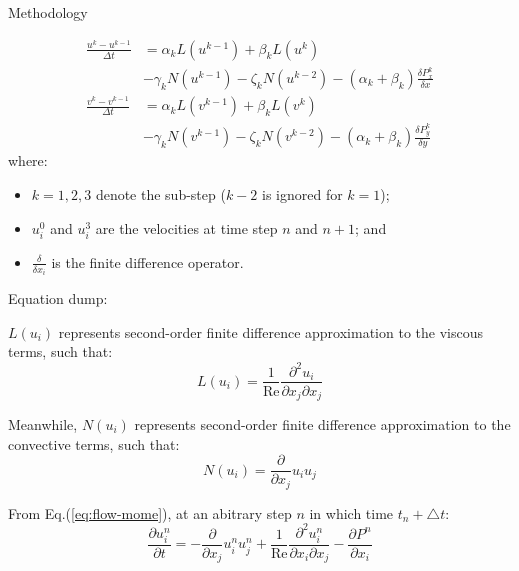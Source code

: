 \documentclass{beamer}
\newcommand{\timestep}{ \triangle t }
\begin{document}
\begin{frame}{Methodology}
	\framebreak 
	
	\begin{align*}
		\frac{u^k - u^{k-1}}{\Delta t} &= \alpha_k L \left( u^{k-1} \right) + \beta_k L \left( u^k \right) \\
		&- \gamma_k N \left( u^{k-1} \right) - \zeta_k N \left( u^{k-2} \right) - (\alpha_k + \beta_k) \frac{\delta P^k_x}{\delta x} \\
		\frac{v^k - v^{k-1}}{\Delta t} &= \alpha_k L \left( v^{k-1} \right) + \beta_k L \left( v^k \right) \\
		&- \gamma_k N \left( v^{k-1} \right) - \zeta_k N \left( v^{k-2} \right) - (\alpha_k + \beta_k) \frac{\delta P^k_y}{\delta y}
	\end{align*}
	where: \begin{itemize}
		\item $k = 1, 2, 3$ denote the sub-step ($k-2$ is ignored for $k=1$);
		\item $u^0_i$ and $u^3_i$ are the velocities at time step $n$ and $n+1$; and
		\item $\frac{\delta }{\delta x_i}$ is the finite difference operator.
	\end{itemize}
	
	\framebreak
	
	\begin{block}{}
		Equation dump:
	\end{block}
	
	$L(u_i)$ represents second-order finite difference approximation to the viscous terms, such that: \begin{equation}
		L (u_i) = \frac{1}{\text{Re}} \frac{\partial^2 u_i}{\partial x_j \partial x_j}
		\label{eq:viscous_terms}
	\end{equation}
	
	Meanwhile, $N(u_i)$ represents second-order finite difference approximation to the convective terms, such that: \begin{equation}
		N (u_i) = \frac{\partial }{\partial x_j} u_i u_j
		\label{eq:convective_terms}
	\end{equation}
	
	From Eq.(\ref{eq:flow-mome}), at an abitrary step $n$ in which time $t_n + \timestep$:
	\begin{equation}
		\frac{\partial u_i^n}{\partial t} = -\frac{\partial }{\partial x_j} u_i^n u_j^n + \frac{1}{\text{Re}} \frac{\partial^2 u_i^n}{\partial x_i \partial x_j} - \frac{\partial P^n}{\partial x_i}
	\end{equation}
	

\end{frame}
\end{document}
